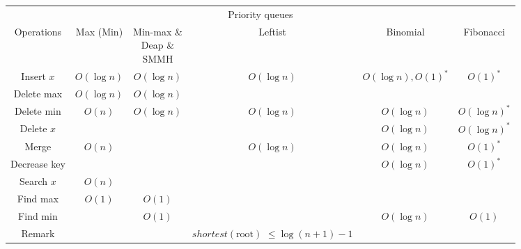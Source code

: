 \begin{table}[H]
    \centering
    \begin{tabular}{|c|c|c|c|c|c|}
        \hline
        \multicolumn{6}{|c|}{Priority queues} \\
        \Xhline{3\arrayrulewidth}
        Operations & Max (Min) & \makecell{Min-max \&\\Deap \&\\SMMH} & Leftist & Binomial & Fibonacci \\
        \Xhline{2\arrayrulewidth}
        Insert $x$ & $O(\log n)$ & $O(\log n)$ & $O(\log n)$ & $O(\log n), O(1)^*$ & $O(1)^*$ \\
        \hline
        Delete max & $O(\log n)$ & $O(\log n)$ & & & \\
        \hline
        Delete min & $O(n)$ & $O(\log n)$ & $O(\log n)$ & $O(\log n)$ & $O(\log n)^*$ \\
        \hline
        Delete $x$ & & & & $O(\log n)$ & $O(\log n)^*$ \\
        \hline
        Merge & $O(n)$ & & $O(\log n)$ & $O(\log n)$ & $O(1)^*$ \\
        \hline
        Decrease key & & & & $O(\log n)$ & $O(1)^*$ \\
        \hline
        Search $x$ & $O(n)$ & & & & \\
        \hline
        Find max & $O(1)$ & $O(1)$ & & & \\
        \hline
        Find min & & $O(1)$ & & $O(\log n)$ & $O(1)$ \\
        \hline
        Remark & & & \makecell{$shortest(\text{root})$\\$\le \log (n + 1) - 1$} & & \\
        \hline
    \end{tabular}
\end{table}

